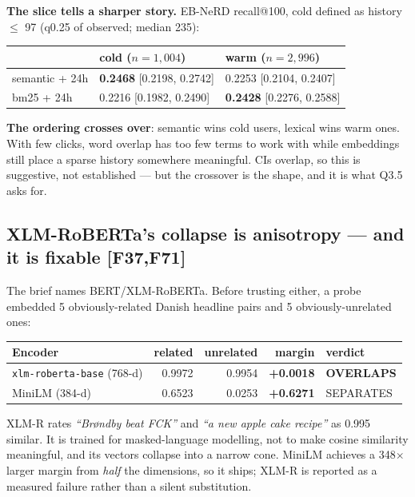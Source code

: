 \documentclass[10pt,a4paper]{article}
\newcommand{\F}[1]{\textcolor{blue!55!black}{\footnotesize[#1]}}
\begin{document}
\textbf{The slice tells a sharper story.} EB-NeRD recall@100, cold defined as history $\le$ 97
(q0.25 of observed; median 235):

\begin{center}\footnotesize
\begin{tabular}{@{}lll@{}}
\toprule
 & \textbf{cold} ($n{=}1{,}004$) & \textbf{warm} ($n{=}2{,}996$) \\
\midrule
semantic + 24h & \textbf{0.2468} [0.2198, 0.2742] & 0.2253 [0.2104, 0.2407] \\
bm25 + 24h     & 0.2216 [0.1982, 0.2490] & \textbf{0.2428} [0.2276, 0.2588] \\
\bottomrule
\end{tabular}
\end{center}

\textbf{The ordering crosses over}: semantic wins cold users, lexical wins warm ones. With few
clicks, word overlap has too few terms to work with while embeddings still place a sparse history
somewhere meaningful. CIs overlap, so this is suggestive, not established --- but the crossover is
the shape, and it is what Q3.5 asks for.

\subsection{XLM-RoBERTa's collapse is anisotropy --- and it is fixable \F{F37,F71}}

The brief names BERT/XLM-RoBERTa. Before trusting either, a probe embedded 5 obviously-related
Danish headline pairs and 5 obviously-unrelated ones:

\begin{center}\footnotesize
\begin{tabular}{@{}lrrrl@{}}
\toprule
Encoder & related & unrelated & margin & verdict \\
\midrule
\texttt{xlm-roberta-base} (768-d) & 0.9972 & 0.9954 & \textbf{+0.0018} & \textbf{OVERLAPS} \\
MiniLM (384-d) & 0.6523 & 0.0253 & \textbf{+0.6271} & SEPARATES \\
\bottomrule
\end{tabular}
\end{center}

XLM-R rates \emph{``Brøndby beat FCK''} and \emph{``a new apple cake recipe''} as 0.995 similar. It
is trained for masked-language modelling, not to make cosine similarity meaningful, and its vectors
collapse into a narrow cone. MiniLM achieves a 348$\times$ larger margin from \emph{half} the
dimensions, so it ships; XLM-R is reported as a measured failure rather than a silent substitution.
\end{document}
